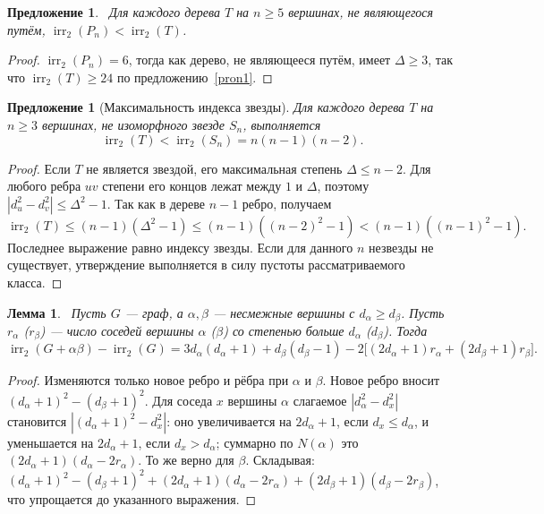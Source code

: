 \documentclass[a4paper,14pt]{extreport}
\theoremstyle{plain}
\newtheorem{lemma}{Лемма}[section]
\newtheorem{proposition}[theorem]{Предложение}
\newtheorem*{proposition*}{Предложение}
\theoremstyle{definition}
\theoremstyle{remark}
\begin{document}
\begin{proposition}~\label{pron2}
	Для каждого дерева $T$ на $n\ge5$ вершинах, не являющегося путём, $\operatorname{irr}_2(P_n)<\operatorname{irr}_2(T)$.
\end{proposition}
\begin{proof}
	$\operatorname{irr}_2(P_n)=6$, тогда как дерево, не являющееся путём, имеет $\Delta\ge3$, так что $\operatorname{irr}_2(T)\ge24$ по предложению~\ref{pron1}.
\end{proof}

\begin{proposition*}[Максимальность индекса звезды]
Для каждого дерева $T$ на $n\ge3$ вершинах, не изоморфного звезде $S_n$,
выполняется
\[
 \operatorname{irr}_2(T)<\operatorname{irr}_2(S_n)=n(n-1)(n-2).
\]
\end{proposition*}
\begin{proof}
Если $T$ не является звездой, его максимальная степень
$\Delta\le n-2$. Для любого ребра $uv$ степени его концов
лежат между $1$ и $\Delta$, поэтому
$|d_u^2-d_v^2|\le\Delta^2-1$.
Так как в дереве $n-1$ ребро, получаем
\[
 \operatorname{irr}_2(T)\le(n-1)(\Delta^2-1)
 \le(n-1)((n-2)^2-1)
 <(n-1)((n-1)^2-1).
\]
Последнее выражение равно индексу звезды.
Если для данного $n$ незвезды не существует, утверждение выполняется
в силу пустоты рассматриваемого класса.
\end{proof}

\begin{lemma}~\label{lemn01}
	Пусть $G$ --- граф, а $\alpha,\beta$ --- несмежные вершины с $d_\alpha\ge d_\beta$. Пусть $r_\alpha$ ($r_\beta$) --- число соседей вершины $\alpha$ ($\beta$) со степенью больше $d_\alpha$ ($d_\beta$). Тогда
	\begin{equation}
		\operatorname{irr}_2(G+\alpha\beta)-\operatorname{irr}_2(G)=3d_\alpha(d_\alpha+1)+d_\beta(d_\beta-1)-2\bigl[(2d_\alpha+1)r_\alpha+(2d_\beta+1)r_\beta\bigr].
	\end{equation}
\end{lemma}
\begin{proof}
	Изменяются только новое ребро и рёбра при $\alpha$ и $\beta$. Новое ребро вносит $(d_\alpha+1)^2-(d_\beta+1)^2$. Для соседа $x$ вершины $\alpha$ слагаемое $|d_\alpha^2-d_x^2|$ становится $|(d_\alpha+1)^2-d_x^2|$:
	оно увеличивается на $2d_\alpha+1$, если $d_x\le d_\alpha$, и уменьшается на $2d_\alpha+1$, если $d_x>d_\alpha$; суммарно по $N(\alpha)$ это $(2d_\alpha+1)(d_\alpha-2r_\alpha)$. То же верно для $\beta$.
	Складывая: $(d_\alpha+1)^2-(d_\beta+1)^2+(2d_\alpha+1)(d_\alpha-2r_\alpha)+(2d_\beta+1)(d_\beta-2r_\beta)$, что упрощается до указанного выражения.
\end{proof}
\end{document}

